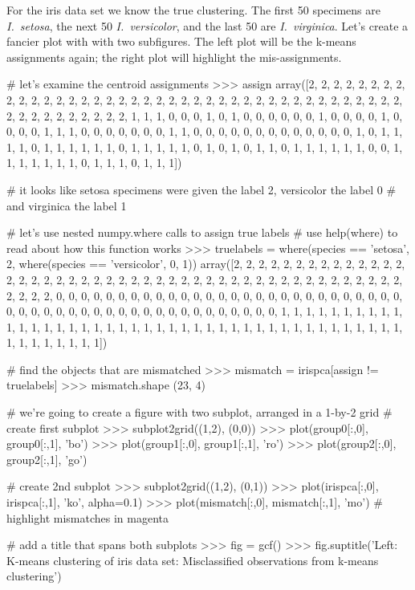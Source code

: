 For the iris data set we know the true clustering.  The first 50 specimens are \textit{I.~setosa}, the next 50 \textit{I.~versicolor}, and the last 50 are \textit{I.~virginica}.  Let's create a fancier plot with with two subfigures. The left plot will be the k-means assignments again; the right plot will highlight the mis-assignments.
%
\begin{python}
# let's examine the centroid assignments
>>> assign
array([2, 2, 2, 2, 2, 2, 2, 2, 2, 2, 2, 2, 2, 2, 2, 2, 2, 2, 2, 2, 2, 2, 2,
       2, 2, 2, 2, 2, 2, 2, 2, 2, 2, 2, 2, 2, 2, 2, 2, 2, 2, 2, 2, 2, 2, 2,
       2, 2, 2, 2, 1, 1, 1, 0, 0, 0, 1, 0, 1, 0, 0, 0, 0, 0, 0, 1, 0, 0, 0,
       0, 1, 0, 0, 0, 0, 1, 1, 1, 0, 0, 0, 0, 0, 0, 0, 1, 1, 0, 0, 0, 0, 0,
       0, 0, 0, 0, 0, 0, 0, 0, 1, 0, 1, 1, 1, 1, 0, 1, 1, 1, 1, 1, 1, 0, 1,
       1, 1, 1, 1, 0, 1, 0, 1, 0, 1, 1, 0, 1, 1, 1, 1, 1, 1, 0, 0, 1, 1, 1,
       1, 1, 1, 1, 0, 1, 1, 1, 0, 1, 1, 1])

# it looks like setosa specimens were given the label 2, versicolor the label 0
# and virginica the label 1

# let's use nested numpy.where calls to assign true labels
# use help(where) to read about how this function works
>>> truelabels = where(species == 'setosa', 2, where(species == 'versicolor', 0, 1))
array([2, 2, 2, 2, 2, 2, 2, 2, 2, 2, 2, 2, 2, 2, 2, 2, 2, 2, 2, 2, 2, 2, 2,
       2, 2, 2, 2, 2, 2, 2, 2, 2, 2, 2, 2, 2, 2, 2, 2, 2, 2, 2, 2, 2, 2, 2,
       2, 2, 2, 2, 0, 0, 0, 0, 0, 0, 0, 0, 0, 0, 0, 0, 0, 0, 0, 0, 0, 0, 0,
       0, 0, 0, 0, 0, 0, 0, 0, 0, 0, 0, 0, 0, 0, 0, 0, 0, 0, 0, 0, 0, 0, 0,
       0, 0, 0, 0, 0, 0, 0, 0, 1, 1, 1, 1, 1, 1, 1, 1, 1, 1, 1, 1, 1, 1, 1,
       1, 1, 1, 1, 1, 1, 1, 1, 1, 1, 1, 1, 1, 1, 1, 1, 1, 1, 1, 1, 1, 1, 1,
       1, 1, 1, 1, 1, 1, 1, 1, 1, 1, 1, 1])

# find the objects that are mismatched
>>> mismatch = irispca[assign != truelabels]
>>> mismatch.shape
(23, 4)

# we're going to create a figure with two subplot, arranged in a 1-by-2 grid
# create first subplot
>>> subplot2grid((1,2), (0,0))
>>> plot(group0[:,0], group0[:,1], 'bo')
>>> plot(group1[:,0], group1[:,1], 'ro')
>>> plot(group2[:,0], group2[:,1], 'go')

# create 2nd subplot
>>> subplot2grid((1,2), (0,1))
>>> plot(irispca[:,0], irispca[:,1], 'ko', alpha=0.1)
>>> plot(mismatch[:,0], mismatch[:,1], 'mo')  # highlight mismatches in magenta

# add a title that spans both subplots
>>> fig = gcf()
>>> fig.suptitle('Left: K-means clustering of iris data set\nRight: Misclassified observations from k-means clustering')
\end{python}

